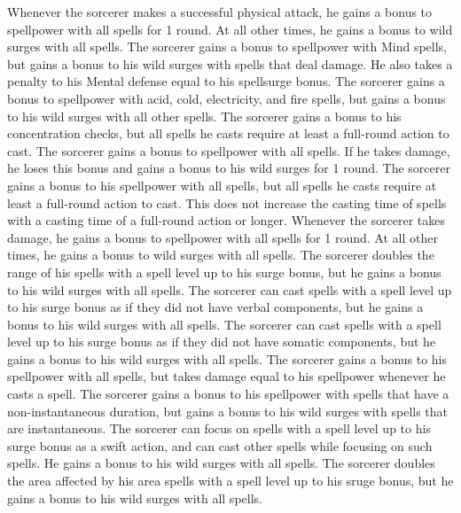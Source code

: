 Whenever the sorcerer makes a successful physical attack, he gains a bonus to spellpower with all spells for 1 round.
At all other times, he gains a bonus to wild surges with all spells.
The sorcerer gains a bonus to spellpower with Mind spells, but gains a bonus to his wild surges with spells that deal damage.
He also takes a penalty to his Mental defense equal to his spellsurge bonus.
The sorcerer gains a bonus to spellpower with acid, cold, electricity, and fire spells, but gains a bonus to his wild surges with all other spells.
The sorcerer gains a bonus to his concentration checks, but all spells he casts require at least a full-round action to cast.
The sorcerer gains a bonus to spellpower with all spells.
If he takes damage, he loses this bonus and gains a bonus to his wild surges for  1 round.
The sorcerer gains a bonus to his spellpower with all spells, but all spells he casts require at least a full-round action to cast.
This does not increase the casting time of spells with a casting time of a full-round action or longer.
Whenever the sorcerer takes damage, he gains a bonus to spellpower with all spells for 1 round.
At all other times, he gains a bonus to wild surges with all spells.
The sorcerer doubles the range of his spells with a spell level up to his surge bonus, but he gains a bonus to his wild surges with all spells.
The sorcerer can cast spells with a spell level up to his surge bonus as if they did not have verbal components, but he gains a bonus to his wild surges with all spells.
The sorcerer can cast spells with a spell level up to his surge bonus as if they did not have somatic components, but he gains a bonus to his wild surges with all spells.
The sorcerer gains a bonus to his spellpower with all spells, but takes damage equal to his spellpower whenever he casts a spell.
The sorcerer gains a bonus to his spellpower with spells that have a non-instantaneous duration, but gains a bonus to his wild surges with spells that are instantaneous.
The sorcerer can focus on spells with a spell level up to his surge bonus as a swift action, and can cast other spells while focusing on such spells.
He gains a bonus to his wild surges with all spells.
The sorcerer doubles the area affected by his area spells with a spell level up to his sruge bonus, but he gains a bonus to his wild surges with all spells.

